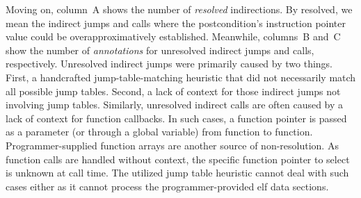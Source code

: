 Moving on, column~A shows the number of \emph{resolved} indirections.
By resolved, we mean the indirect jumps and calls where the postcondition's instruction pointer value could be overapproximatively established.
Meanwhile, columns~B and~C show the number of \emph{annotations} for unresolved indirect jumps and calls, respectively.
Unresolved indirect jumps were primarily caused by two things.
First, a handcrafted jump-table-matching heuristic that did not necessarily match all possible jump tables.
Second, a lack of context for those indirect jumps not involving jump tables.
Similarly, unresolved indirect calls are often caused by a lack of context for function callbacks.
In such cases, a function pointer is passed as a parameter (or through a global variable) from function to function.
Programmer-supplied function arrays are another source of non-resolution.
As function calls are handled without context, the specific function pointer to select is unknown at call time.
The utilized jump table heuristic cannot deal with such cases either as it cannot process the programmer-provided \ac{elf} data sections.

